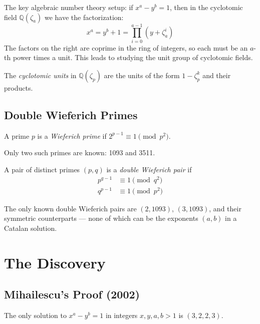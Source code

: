 The key algebraic number theory setup: if $x^a - y^b = 1$, then in the cyclotomic field $\mathbb{Q}(\zeta_a)$ we have the factorization:
\begin{equation}
x^a = y^b + 1 = \prod_{i=0}^{a-1} (y + \zeta_a^i)
\end{equation}
The factors on the right are coprime in the ring of integers, so each must be an $a$-th power times a unit. This leads to studying the unit group of cyclotomic fields.

\begin{definition}
The \emph{cyclotomic units} in $\mathbb{Q}(\zeta_p)$ are the units of the form $1 - \zeta_p^k$ and their products.
\end{definition}

\subsection{Double Wieferich Primes}

\begin{definition}
A prime $p$ is a \emph{Wieferich prime} if $2^{p-1} \equiv 1 \pmod{p^2}$.
\end{definition}

Only two such primes are known: 1093 and 3511.

\begin{definition}
A pair of distinct primes $(p, q)$ is a \emph{double Wieferich pair} if
\begin{align}
p^{q-1} &\equiv 1 \pmod{q^2} \\
q^{p-1} &\equiv 1 \pmod{p^2}
\end{align}
\end{definition}

The only known double Wieferich pairs are $(2, 1093)$, $(3, 1093)$, and their symmetric counterparts — none of which can be the exponents $(a, b)$ in a Catalan solution.

\section{The Discovery}

\subsection{Mihailescu's Proof (2002)}

\begin{theorem}
The only solution to $x^a - y^b = 1$ in integers $x, y, a, b > 1$ is $(3, 2, 2, 3)$.
\end{theorem}

